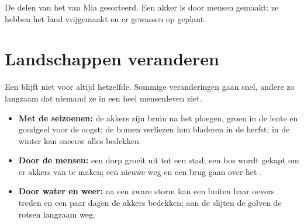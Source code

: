 \begin{omfigure}

{\small De delen van het  van Mia gesorteerd. Een akker is
door mensen gemaakt: ze hebben het land vrijgemaakt en er gewassen op geplant.}
\label{fig:g1:landscapes-around-us:sort}
\end{omfigure}

\section{Landschappen veranderen}

Een  blijft niet voor altijd hetzelfde. Sommige veranderingen
gaan snel, andere zo langzaam dat niemand ze in een heel mensenleven ziet.
\begin{itemize}
  \item \textbf{Met de seizoenen:} de akkers zijn bruin na het ploegen,
        groen in de lente en goudgeel voor de oogst; de bomen verliezen hun
        bladeren in de herfst; in de winter kan sneeuw alles bedekken.
  \item \textbf{Door de mensen:} een dorp groeit uit tot een stad; een bos
        wordt gekapt om er akkers van te maken; een nieuwe weg en een brug
        gaan over het .
  \item \textbf{Door water en weer:} na een zware storm kan een 
        buiten haar oevers treden en een paar dagen de akkers bedekken; aan
        de  slijten de golven de rotsen langzaam weg.
\end{itemize}

